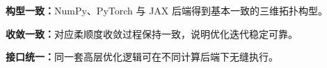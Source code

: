 \documentclass[notheorems]{beamer}
\begin{document}
\begin{frame}
		\begin{tcolorbox}[
			colback=structure.fg, colframe=structure.fg,
			coltext=white, boxrule=0pt, arc=3pt,
			top=4pt, bottom=4pt, left=8pt, right=8pt]
			{\fontsize{7.5}{11}\selectfont\sffamily
				\setlength{\parskip}{0pt}
				\textbf{ 构型一致：}NumPy、PyTorch 与 JAX 后端得到基本一致的三维拓扑构型。
				
				\textbf{ 收敛一致：}对应柔顺度收敛过程保持一致，说明优化迭代稳定可靠。
				
				\textbf{ 接口统一：}同一套高层优化逻辑可在不同计算后端下无缝执行。
			}
		\end{tcolorbox}
		
	\end{frame}
	
\end{document}
